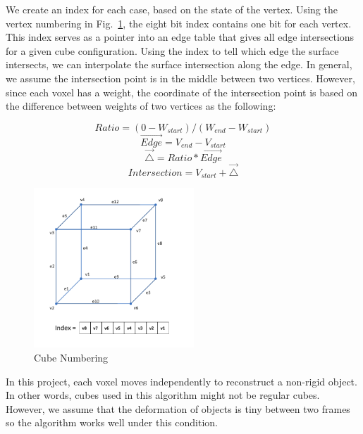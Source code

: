 \documentclass{article}
\begin{document}
We create an index for each case, based on the state of the vertex. Using the vertex numbering in Fig.~\ref{fig:cubenum}, the eight bit index contains one bit for each vertex. This index serves as a pointer into an edge table that gives all edge intersections for a given cube configuration. Using the index to tell which edge the surface intersects, we can interpolate the surface intersection along the edge. In general, we assume the intersection point is in the middle between two vertices. However, since each voxel has a weight, the coordinate of the intersection point is based on the difference between weights of two vertices as the following:

\[Ratio = ( 0 - W_{start} ) / ( W_{end} - W_{start})\]
\[\overrightarrow{Edge} = V_{end}- V_{start}\]
\[\overrightarrow{\triangle} = Ratio * \overrightarrow{Edge}\]
\[Intersection = V_{start} + \overrightarrow{\triangle}\]


\begin{figure}[h]
\centering
\includegraphics[width=6cm]{figures/Cubenum.png}
\caption{Cube Numbering}
\label{fig:cubenum}
\end{figure}

In this project, each voxel moves independently to reconstruct a non-rigid object. In other words, cubes used in this algorithm might not be regular cubes. However, we assume that the deformation of objects is tiny between two frames so the algorithm works well under this condition. 
\end{document}
